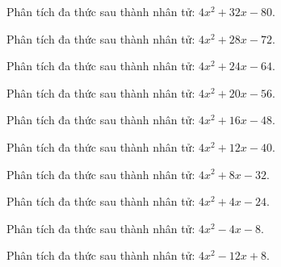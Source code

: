 \begin{bt}
	Phân tích đa thức sau thành nhân tử: $4 x^2 + 32 x - 80$.
\end{bt}
\begin{bt}
	Phân tích đa thức sau thành nhân tử: $4 x^2 + 28 x - 72$.
\end{bt}
\begin{bt}
	Phân tích đa thức sau thành nhân tử: $4 x^2 + 24 x - 64$.
\end{bt}
\begin{bt}
	Phân tích đa thức sau thành nhân tử: $4 x^2 + 20 x - 56$.
\end{bt}
\begin{bt}
	Phân tích đa thức sau thành nhân tử: $4 x^2 + 16 x - 48$.
\end{bt}
\begin{bt}
	Phân tích đa thức sau thành nhân tử: $4 x^2 + 12 x - 40$.
\end{bt}
\begin{bt}
	Phân tích đa thức sau thành nhân tử: $4 x^2 + 8 x - 32$.
\end{bt}
\begin{bt}
	Phân tích đa thức sau thành nhân tử: $4 x^2 + 4 x - 24$.
\end{bt}
\begin{bt}
	Phân tích đa thức sau thành nhân tử: $4 x^2 - 4 x - 8$.
\end{bt}
\begin{bt}
	Phân tích đa thức sau thành nhân tử: $4 x^2 - 12 x + 8$.
\end{bt}

